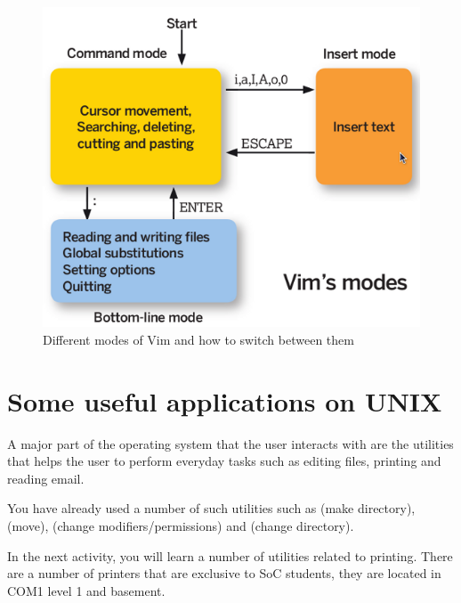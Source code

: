 \begin{frame}
\begin{figure}
\begin{center}
\includegraphics[scale=0.4]{vim_modes}
\end{center}
\caption{Different modes of Vim and how to switch between them}
\label{fig:vim_modes}
\end{figure}
\end{frame}


\section{Some useful applications on UNIX}
A major part of the operating system that the user interacts with are the
utilities that helps the user to perform everyday tasks such as editing files,
printing and reading email.     

You have already used a number of such utilities such as  (make
directory),  (move),  (change modifiers/permissions)
and  (change directory).

In the next activity, you will learn a number of utilities related to printing.
There are a number of printers that are exclusive to SoC students, they are
located in COM1 level 1 and basement.  

